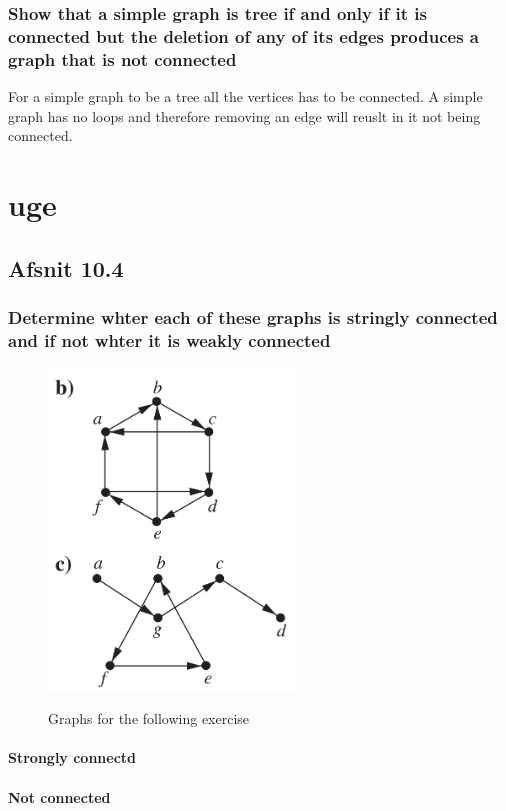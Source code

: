 \documentclass[12pt, a4paper]{report}
\begin{document}
		\subsection{Show that a simple graph is tree if and only if it is connected but the deletion of any of its edges produces a graph that is not connected}
			For a simple graph to be a tree all the vertices has to be connected. A simple graph has no loops and therefore removing an edge will reuslt in it not being connected.
	
	\chapter{uge}
		\section{Afsnit 10.4}
			\setcounter{subsection}{11}
			\subsection{Determine whter each of these graphs is stringly connected and if not whter it is weakly connected}
				\begin{figure}[h!]
					\centering
					\includegraphics[width=250px]{assets/10,4,12,bc.png}
					\label{}
				\caption{Graphs for the following exercise}
				\end{figure}
				
				\setcounter{subsubsection}{1}
				\subsubsection{Strongly connectd}
				\subsubsection{Not connected}
			\setcounter{subsection}{13}
\end{document}
